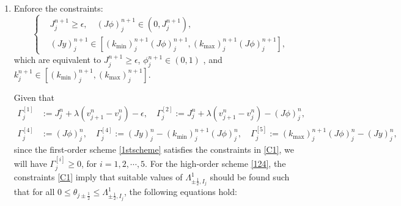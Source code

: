 \documentclass[times,final,11pt]{elsarticle}
\numberwithin{equation}{section}
\theoremstyle{definition}
\theoremstyle{remark}
\begin{document}
\begin{enumerate}[label=(\roman*),leftmargin=6mm]
	
	\item[\textbf{Step 1}:]	Enforce the constraints:
	\begin{equation}
	\label{C1}
		\left\{
		\begin{aligned}
			&J_j^{n + 1} \geq \epsilon, \quad (J\phi)_j^{n + 1} \in (0, J_j^{n + 1}), \\
			&(Jy)_j^{n + 1} \in [(k_{\min})_j^{n + 1}(J\phi)_j^{n + 1}, (k_{\max})_j^{n + 1}(J\phi)_j^{n + 1}],
		\end{aligned}
		\right.
	\end{equation}
	which are equivalent to $J_j^{n + 1} \geq \epsilon$, $\phi_j^{n + 1} \in (0, 1)$ , and $k_j^{n + 1} \in [(k_{\min})_j^{n + 1}, (k_{\max})_j^{n + 1}]$.
	
	Given that 
	\begin{equation*}
	    \begin{aligned}
	    \Gamma_j^{[1]} &:= J_j^n + \lambda ( v_{j + 1}^n - v_j^n ) - \epsilon, \quad \Gamma_j^{[2]} :=  J_j^n + \lambda ( v_{j + 1}^n - v_j^n ) - (J\phi)_j^n, \\
	    \Gamma_j^{[4]} &:= (J\phi)_j^n, \quad \Gamma_j^{[4]} := (Jy)_j^n - (k_{\min})_j^{n + 1} (J\phi)_j^n, \quad \Gamma_j^{[5]} := (k_{\max})_j^{n + 1} (J\phi)_j^n - (Jy)_j^n,
	    \end{aligned}
	\end{equation*}
	since the first-order scheme \eqref{1stscheme} satisfies the constraints in \eqref{C1}, we will have $\Gamma_j^{[i]} \geq 0$, for $i = 1,2,\cdots, 5.$
	For the high-order scheme \eqref{124}, the constraints \eqref{C1} imply that suitable values of $\Lambda_{\pm \frac{1}{2}, I_j}^1$ should be found such that for all $0 \leq \theta_{j \pm \frac12} \leq \Lambda_{\pm \frac{1}{2}, I_j}^1$, the following equations hold:


\end{enumerate}
\end{document}
